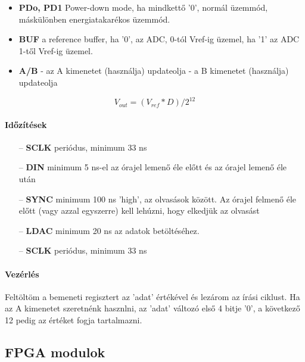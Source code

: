 \documentclass[12pt]{article}
\begin{document}
    \begin{itemize}
      \item \textbf{PDo, PD1} \linebreak
            \quad Power-down mode, ha mindkettő '0', normál üzemmód, máskülönben energiatakarékos üzemmód.
      \item \textbf{BUF} \linebreak
            \quad a reference buffer, ha '0', az ADC, 0-tól Vref-ig üzemel, ha '1' az ADC 1-től Vref-ig üzemel.
      \item \textbf{A/B} \linebreak
             - az A kimenetet (használja) updateolja \linebreak
             - a B kimenetet (használja) updateolja
    \end{itemize}
    \[V_{out}=(V_{ref}*D)/2^{12}\]
    
    \paragraph{Időzítések}
    \begin{itemize}
        \item [--]\textbf{SCLK} periódus, minimum 33 ns
        \item [--]\textbf{DIN} minimum 5 ns-el az órajel lemenő éle előtt és az órajel lemenő éle után
        \item [--]\textbf{SYNC} minimum 100 ns 'high', az olvasások között. Az órajel felmenő éle előtt (vagy azzal egyszerre) kell lehúzni, hogy elkedjük az olvasást
        \item [--]\textbf{LDAC} minimum 20 ns az adatok betöltéséhez.
        \item [--]\textbf{SCLK} periódus, minimum 33 ns 
    \end{itemize}
   
    
    \paragraph{Vezérlés\newline}{
  Feltöltöm a bemeneti regisztert az 'adat' értékével és lezárom az írási ciklust.
  Ha az A kimenetet szeretnénk hasznlni, az 'adat' változó első 4 bitje '0', a következő 12 pedig az értéket fogja tartalmazni.\newpage}
  \newpage 
  \subsection{FPGA modulok\newline}
\end{document}
